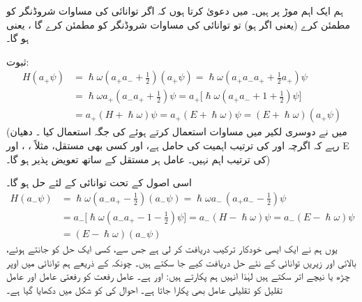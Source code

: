  ہم ایک اہم موڑ پر ہیں۔ میں دعویٰ کرتا ہوں  کہ اگر توانائی  کی مساوات شروڈنگر کو  مطمئن کرے 
(یعنی اگر  ہو)  تو  توانائی  کی مساوات شروڈنگر کو  مطمئن کرے گا ، یعنی  ہو گا۔

ثبوت:
\begin{align*}
H ( a_+ \psi ) &= \hslash \omega ( a_+ a_- + \frac{1}{2}) (a_+ \psi) = \hslash \omega (a_+ a_- a_+ + \frac{1}{2} a_+) \psi
\\
 &= \hslash \omega a_+ ( a_- a_+ + \tfrac{1}{2} ) \psi = a_+\big[ \hslash \omega ( a_+ a_- + 1 + \tfrac{1}{2} ) \psi \big ]\\
 &= a_+ ( H + \hslash \omega ) \psi = a_+ ( E + \hslash \omega ) \psi = ( E + \hslash \omega ) ( a_+ \psi )
\end{align*} 
(میں نے دوسری لکیر میں مساوات   استعمال کرتے ہوئے 
 کی جگہ  استعمال کیا ۔ دھیان رہے کہ  اگرچہ  اور  کی ترتیب اہمیت کی  حامل ہے، 
 اور کسی بھی مستقل، مثلاً ،  ،  اور E  کی ترتیب اہم نہیں۔  عامل ہر مستقل کے ساتھ تعویض پذیر  ہو گا۔)

 اسی  اصول کے تحت توانائی    کے لئے حل   ہو گا۔
\begin{align*}
H(a_- \psi ) &= \hslash \omega ( a_- a_+ - \tfrac{1}{2}) (a_- \psi) = \hslash \omega a_- \,( a_+ a_- - \tfrac{1}{2} ) \psi\\
&= a_- \big[ \hslash \omega ( a_- a_+ - 1 - \tfrac{1}{2} ) \psi \big] = a_- ( H - \hslash \omega )\psi = a_- ( E - \hslash \omega) \psi \\	
&=( E - \hslash \omega ) ( a_- \psi )
\end{align*}
یوں ہم نے ایک ایسی خودکار ترکیب دریافت کر لی ہے جس سے، کسی ایک حل کو جانتے ہوئے، بالائی اور زیریں توانائی کے نئے حل دریافت کیے جا سکتے ہیں۔ چونکہ  کے ذریعے ہم توانائی میں اوپر چڑھ یا نیچے اتر سکتے ہیں لہٰذا انہیں ہم  پکارتے ہیں:   اور   ہے۔ عامل رفعت کو رفعتی عامل اور عامل تقلیل کو تقلیلی عامل بھی پکارا جاتا ہے۔ احوال کی  کو شکل  میں دکھایا گیا ہے۔


